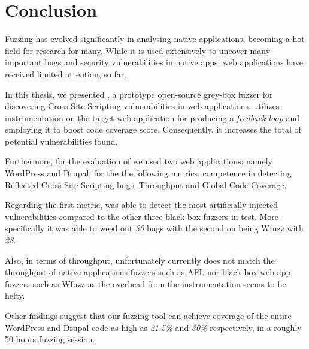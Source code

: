 \chapter{Conclusion}
\label{sec:conclusion}
\vspace*{0.25cm}

Fuzzing has evolved significantly in analysing native applications, becoming a hot field for research for many. While it is used extensively to uncover many important bugs and security vulnerabilities in native apps, web applications have received limited attention, so far.

In this thesis, we presented \pname{}, a prototype open-source grey-box fuzzer for discovering Cross-Site Scripting vulnerabilities in web applications. \pname{} utilizes instrumentation on the target web application for producing a \emph{feedback loop} and employing it to boost code coverage score. Consequently, it increases the total of potential vulnerabilities found.

Furthermore, for the evaluation of \pname{} we used two web applications; namely WordPress and Drupal, for the the following metrics: competence in detecting Reflected Cross-Site Scripting bugs, Throughput and Global Code Coverage.

Regarding the first metric, \pname{} was able to detect the most artificially injected vulnerabilities compared to the other three black-box fuzzers in test. More specifically it was able to weed out \emph{30} bugs with the second on being Wfuzz with \emph{28}.

Also, in terms of throughput, unfortunately currently \pname{} does not match the throughput of native applications fuzzers such as AFL nor black-box web-app fuzzers such as Wfuzz as the overhead from the instrumentation seems to be hefty.

Other findings suggest that our fuzzing tool can achieve coverage of the entire WordPress and Drupal code as high as \emph{21.5\%} and \emph{30\%} respectively, in a roughly 50 hours fuzzing session.

